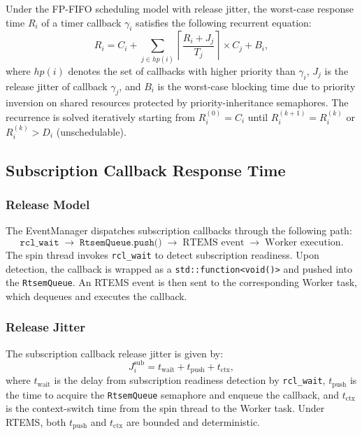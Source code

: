Under the FP-FIFO scheduling model with release jitter, the worst-case response time $R_i$ of a timer callback $\gamma_i$ satisfies the following recurrent equation:
\begin{equation}
    R_i = C_i + \sum_{j \in hp(i)} \left\lceil \frac{R_i + J_j}{T_j} \right\rceil \times C_j + B_i,
    \label{eq:rta-timer}
\end{equation}
where $hp(i)$ denotes the set of callbacks with higher priority than $\gamma_i$, $J_j$ is the release jitter of callback $\gamma_j$, and $B_i$ is the worst-case blocking time due to priority inversion on shared resources protected by priority-inheritance semaphores.
The recurrence is solved iteratively starting from $R_i^{(0)} = C_i$ until $R_i^{(k+1)} = R_i^{(k)}$ or $R_i^{(k)} > D_i$ (unschedulable).

\subsection{Subscription Callback Response Time}

\subsubsection{Release Model}

The EventManager dispatches subscription callbacks through the following path:
\begin{equation}
    \texttt{rcl\_wait} \;\to\; \texttt{RtsemQueue.push()} \;\to\; \text{RTEMS event} \;\to\; \text{Worker execution}.
\end{equation}
The spin thread invokes \texttt{rcl\_wait} to detect subscription readiness.
Upon detection, the callback is wrapped as a \texttt{std::function<void()>} and pushed into the \texttt{RtsemQueue}.
An RTEMS event is then sent to the corresponding Worker task, which dequeues and executes the callback.

\subsubsection{Release Jitter}

The subscription callback release jitter is given by:
\begin{equation}
    J_i^{\mathrm{sub}} = t_{\mathrm{wait}} + t_{\mathrm{push}} + t_{\mathrm{ctx}},
\end{equation}
where $t_{\mathrm{wait}}$ is the delay from subscription readiness detection by \texttt{rcl\_wait}, $t_{\mathrm{push}}$ is the time to acquire the \texttt{RtsemQueue} semaphore and enqueue the callback, and $t_{\mathrm{ctx}}$ is the context-switch time from the spin thread to the Worker task.
Under RTEMS, both $t_{\mathrm{push}}$ and $t_{\mathrm{ctx}}$ are bounded and deterministic.

